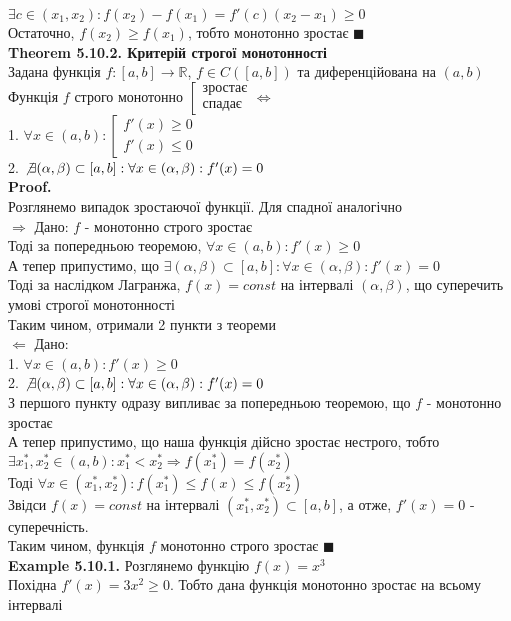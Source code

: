 \documentclass[a4paper, 14pt]{extarticle}
\def\bigline{\vspace{5mm}\\}
\def\ex#1{\textbf{Example {#1}}}
\def\th#1{\textbf{Theorem {#1}}}
\def\proof{\textbf{Proof.}\\}
\def\bigline{\vspace{5mm}\\}
\def\qed{$\blacksquare$}
\begin{document}
$\exists c \in (x_1,x_2): f(x_2)-f(x_1) = f'(c)(x_2-x_1) \geq 0$\\
Остаточно, $f(x_2) \geq f(x_1)$, тобто монотонно зростає \qed
\bigline
\th{5.10.2. Критерій строгої монотонності}\\
Задана функція $f: [a,b] \to \mathbb{R}$, $f \in C([a,b])$ та диференційована на $(a,b)$\\
Функція $f$ строго монотонно $\left[ \begin{gathered} \textrm{зростає} \\ \textrm{спадає} \end{gathered} \right. \iff$\\
 1. $\forall x \in (a,b): \left[ \begin{gathered} f'(x) \geq 0 \\ f'(x) \leq 0 \end{gathered} \right.$\\
 2. $\not\exists (\alpha, \beta) \subset [a,b]: \forall x \in (\alpha, \beta): f'(x) = 0$\\
\proof
Розглянемо випадок зростаючої функції. Для спадної аналогічно\\
$\boxed{\Rightarrow}$ Дано: $f$ - монотонно строго зростає\\
Тоді за попередньою теоремою, $\forall x \in (a,b): f'(x) \geq 0$\\
А тепер припустимо, що $\exists (\alpha, \beta) \subset [a,b]: \forall x \in (\alpha, \beta): f'(x) = 0$\\
Тоді за наслідком Лагранжа, $f(x) = const$ на інтервалі $(\alpha, \beta)$, що суперечить умові строгої монотонності\\
Таким чином, отримали 2 пункти з теореми
\bigline
$\boxed{\Leftarrow}$ Дано:\\
1. $\forall x \in (a,b): f'(x) \geq 0$\\
2. $\not\exists (\alpha, \beta) \subset [a,b]: \forall x \in (\alpha, \beta): f'(x) = 0$\\
З першого пункту одразу випливає за попередньою теоремою, що $f$ - монотонно зростає\\
А тепер припустимо, що наша функція дійсно зростає нестрого, тобто\\
$\exists x_1^*, x_2^* \in (a,b): x_1^* < x_2^* \Rightarrow f(x_1^*) = f(x_2^*)$\\
Тоді $\forall x \in (x_1^*,x_2^*): f(x_1^*) \leq f(x) \leq f(x_2^*)$\\
Звідси $f(x) = const$ на інтервалі $(x_1^*, x_2^*) \subset [a,b]$, а отже, $f'(x) = 0$ - суперечність.\\
Таким чином, функція $f$ монотонно строго зростає \qed
\bigline
\ex{5.10.1.} Розглянемо функцію $f(x) = x^3$\\
Похідна $f'(x) = 3x^2 \geq 0$. Тобто дана функція монотонно зростає на всьому інтервалі
\bigline
\end{document}
